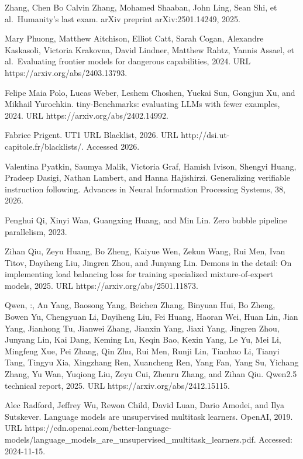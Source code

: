 Zhang, Chen Bo Calvin Zhang, Mohamed Shaaban, John Ling, Sean Shi, et
al.~Humanity's last exam. arXiv preprint arXiv:2501.14249, 2025.

Mary Phuong, Matthew Aitchison, Elliot Catt, Sarah Cogan, Alexandre
Kaskasoli, Victoria Krakovna, David Lindner, Matthew Rahtz, Yannis
Assael, et al.~Evaluating frontier models for dangerous capabilities,
2024. URL https://arxiv.org/abs/2403.13793.

Felipe Maia Polo, Lucas Weber, Leshem Choshen, Yuekai Sun, Gongjun Xu,
and Mikhail Yurochkin. tiny-Benchmarks: evaluating LLMs with fewer
examples, 2024. URL https://arxiv.org/abs/2402.14992.

Fabrice Prigent. UT1 URL Blacklist, 2026. URL
http://dsi.ut-capitole.fr/blacklists/. Accessed 2026.

Valentina Pyatkin, Saumya Malik, Victoria Graf, Hamish Ivison, Shengyi
Huang, Pradeep Dasigi, Nathan Lambert, and Hanna Hajishirzi.
Generalizing verifiable instruction following. Advances in Neural
Information Processing Systems, 38, 2026.

Penghui Qi, Xinyi Wan, Guangxing Huang, and Min Lin. Zero bubble
pipeline parallelism, 2023.

Zihan Qiu, Zeyu Huang, Bo Zheng, Kaiyue Wen, Zekun Wang, Rui Men, Ivan
Titov, Dayiheng Liu, Jingren Zhou, and Junyang Lin. Demons in the
detail: On implementing load balancing loss for training specialized
mixture-of-expert models, 2025. URL https://arxiv.org/abs/2501.11873.

Qwen, :, An Yang, Baosong Yang, Beichen Zhang, Binyuan Hui, Bo Zheng,
Bowen Yu, Chengyuan Li, Dayiheng Liu, Fei Huang, Haoran Wei, Huan Lin,
Jian Yang, Jianhong Tu, Jianwei Zhang, Jianxin Yang, Jiaxi Yang, Jingren
Zhou, Junyang Lin, Kai Dang, Keming Lu, Keqin Bao, Kexin Yang, Le Yu,
Mei Li, Mingfeng
Xue, Pei Zhang, Qin Zhu, Rui Men, Runji Lin, Tianhao Li, Tianyi Tang,
Tingyu Xia, Xingzhang Ren, Xuancheng Ren, Yang Fan, Yang Su, Yichang
Zhang, Yu Wan, Yuqiong Liu, Zeyu Cui, Zhenru Zhang, and Zihan Qiu.
Qwen2.5 technical report, 2025. URL https://arxiv.org/abs/2412.15115.

Alec Radford, Jeffrey Wu, Rewon Child, David Luan, Dario Amodei, and Ilya
Sutskever. Language models are unsupervised multitask learners. OpenAI,
2019. URL https://cdn.openai.com/better-language-models/language\_models\_are\_unsupervised\_multitask\_learners.pdf. Accessed: 2024-11-15.

